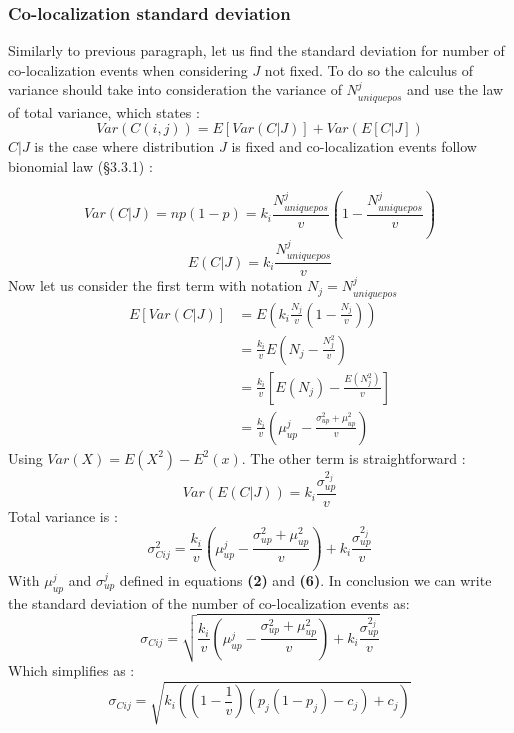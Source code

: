 \documentclass{article}
\begin{document}
\subsubsection{Co-localization standard deviation}

Similarly to previous paragraph, let us find the standard deviation for number of co-localization events when considering $J$ not fixed. 
To do so the calculus of variance should take into consideration the variance of $N^j_{uniquepos}$ and use the law of total variance,
which states :
\[
Var(C(i,j)) = E[Var(C|J)] + Var(E[C|J])
\] 
$C|J$ is the case where distribution $J$ is fixed and co-localization events follow bionomial law (\S3.3.1) :

\[
    Var(C|J) = np(1-p) = k_i \frac{N^j_{uniquepos}}{v}(1-\frac{N^j_{uniquepos}}{v})
\]
\[
    E(C|J) = k_i \frac{N^j_{uniquepos}}{v}
\]
Now let us consider the first term with notation $N_j = N^j_{uniquepos}$
\[
    \begin{split}
    E[Var(C|J)] &= E(k_i \frac{N_j}{v}(1-\frac{N_j}{v})) \\
    &= \frac{k_i}{v}E(N_j - \frac{N^2_j}{v}) \\
    &= \frac{k_i}{v}[E(N_j) - \frac{E(N^2_j)}{v}] \\
    &= \frac{k_i}{v}(\mu^j_{up} - \frac{\sigma^2_{up} + \mu^2_{up}}{v})
\end{split}
\]
Using $Var(X) = E(X^2) - E^2(x)$.\newline
The other term is straightforward : 
\[
Var(E(C|J)) = k_i\frac{\sigma^{2_j}_{up}}{v}
\]
Total variance is :
\[
    \sigma^2_{Cij} = \frac{k_i}{v}(\mu^j_{up} - \frac{\sigma^2_{up} + \mu^2_{up}}{v}) + k_i\frac{\sigma^{2_j}_{up}}{v}
\]
With $\mu^j_{up}$ and $\sigma^j_{up}$ defined in equations \textbf{(2)} and \textbf{(6)}.\newline
In conclusion we can write the standard deviation of the number of co-localization events as:
\begin{equation}
    \sigma_{Cij} = \sqrt{\frac{k_i}{v}(\mu^j_{up} - \frac{\sigma^2_{up} + \mu^2_{up}}{v}) + k_i\frac{\sigma^{2_j}_{up}}{v}}
\end{equation}
Which simplifies as :
\[
    \sigma_{Cij} = \sqrt{k_i((1-\frac{1}{v})(p_j(1-p_j)-c_j)+c_j)}
\]
\end{document}
